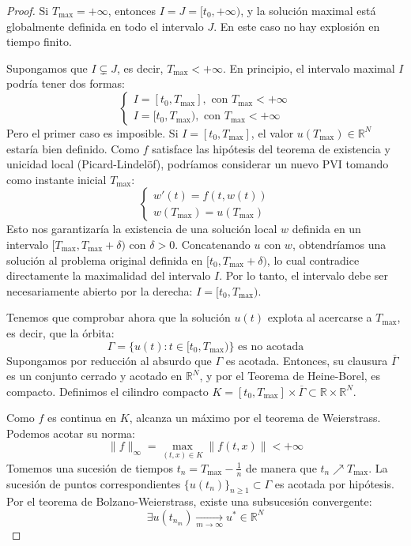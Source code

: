 \begin{proof}
    Si $T_{\text{max}} = +\infty$, entonces $I = J = [t_0, +\infty)$, y la solución maximal está globalmente definida en todo el intervalo $J$. En este caso no hay explosión en tiempo finito.
    
    Supongamos que $I \subsetneq J$, es decir, $T_{\text{max}} < +\infty$. En principio, el intervalo maximal $I$ podría tener dos formas:
    \[
        \begin{cases}
            I = [t_0, T_{\text{max}}], \text{ con } T_{\text{max}} < +\infty \\
            I = [t_0, T_{\text{max}}), \text{ con } T_{\text{max}} < +\infty
        \end{cases}
    \]
    Pero el primer caso es imposible. Si $I = [t_0, T_{\text{max}}]$, el valor $u(T_{\text{max}}) \in \mathbb{R}^N$ estaría bien definido. Como $f$ satisface las hipótesis del teorema de existencia y unicidad local (Picard-Lindelöf), podríamos considerar un nuevo PVI tomando como instante inicial $T_{\text{max}}$:
    \[
        \begin{cases}
            w'(t) = f(t, w(t)) \\
            w(T_{\text{max}}) = u(T_{\text{max}})
        \end{cases}
    \]
    Esto nos garantizaría la existencia de una solución local $w$ definida en un intervalo $[T_{\text{max}}, T_{\text{max}} + \delta)$ con $\delta > 0$. Concatenando $u$ con $w$, obtendríamos una solución al problema original definida en $[t_0, T_{\text{max}} + \delta)$, lo cual contradice directamente la maximalidad del intervalo $I$. Por lo tanto, el intervalo debe ser necesariamente abierto por la derecha: $I = [t_0, T_{\text{max}})$.

    Tenemos que comprobar ahora que la solución $u(t)$ explota al acercarse a $T_{\text{max}}$, es decir, que la órbita:
    \[
        \Gamma = \{ u(t) : t \in [t_0, T_{\text{max}}) \} \text{ es no acotada}
    \]
    Supongamos por reducción al absurdo que $\Gamma$ es acotada. Entonces, su clausura $\overline{\Gamma}$ es un conjunto cerrado y acotado en $\mathbb{R}^N$, y por el Teorema de Heine-Borel, es compacto. 
    Definimos el cilindro compacto $K = [t_0, T_{\text{max}}] \times \overline{\Gamma} \subset \mathbb{R} \times \mathbb{R}^N$.
    
    Como $f$ es continua en $K$, alcanza un máximo por el teorema de Weierstrass. Podemos acotar su norma:
    \[
        \| f \|_\infty = \max_{(t, x) \in K} \| f(t, x) \| < +\infty
    \]
    Tomemos una sucesión de tiempos $t_n = T_{\text{max}} - \frac{1}{n}$ de manera que $t_n \nearrow T_{\text{max}}$. La sucesión de puntos correspondientes $\{u(t_n)\}_{n \geq 1} \subset \Gamma$ es acotada por hipótesis. Por el teorema de Bolzano-Weierstrass, existe una subsucesión convergente:
    \[
        \exists u(t_{n_m}) \xrightarrow[m \to \infty]{} u^* \in \mathbb{R}^N
    \]
    

\end{proof}
